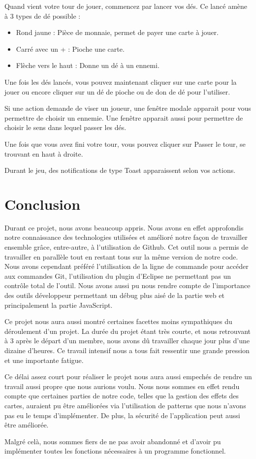 \documentclass[11pt]{scrreprt}
\begin{document}
    Quand vient votre tour de jouer, commencez par lancer vos dés. Ce lancé amène à 3 types de dé possible :

    \begin{itemize}
        \item Rond jaune : Pièce de monnaie, permet de payer une carte à jouer.
        \item Carré avec un + : Pioche une carte.
        \item Flèche vers le haut : Donne un dé à un ennemi.
    \end{itemize}

    Une fois les dés lancés, vous pouvez maintenant cliquer sur une carte pour la jouer ou encore cliquer sur un dé de pioche ou de don de dé pour l'utiliser.

    Si une action demande de viser un joueur, une fenêtre modale apparait pour vous permettre de choisir un ennemie. Une fenêtre apparait aussi pour permettre de choisir le sens dans lequel passer les dés.

    Une fois que vous avez fini votre tour, vous pouvez cliquer sur \og Passer le tour\fg{}, se trouvant en haut à droite.

    Durant le jeu, des notifications de type Toast apparaissent selon vos actions.

    \chapter{Conclusion}
    Durant ce projet, nous avons beaucoup appris. Nous avons en effet approfondis notre connaissance des technologies utilisées et amélioré notre façon de travailler ensemble grâce, entre-autre, à l'utilisation de Github. Cet outil nous a permis de travailler en parallèle tout en restant tous sur la même version de notre code. Nous avons cependant préféré l'utilisation de la ligne de commande pour accéder aux commandes Git, l'utilisation du plugin d'Eclipse ne permettant pas un contrôle total de l'outil. Nous avons aussi pu nous rendre compte de l'importance des \og outils développeur\fg{} permettant un débug plus aisé de la partie web et principalement la partie JavaScript.

    Ce projet nous aura aussi montré certaines facettes moins sympathiques du déroulement d'un projet. La durée du projet étant très courte, et nous retrouvant à 3 après le départ d'un membre, nous avons dû travailler chaque jour plus d'une dizaine d'heures. Ce travail intensif nous a tous fait ressentir une grande pression et une importante fatigue.

    Ce délai assez court pour réaliser le projet nous aura aussi empechés de rendre un travail aussi propre que nous aurions voulu. Nous nous sommes en effet rendu compte que certaines parties de notre code, telles que la gestion des effets des cartes, auraient pu être améliorées via l'utilisation de patterns que nous n'avons pas eu le temps d'implémenter. De plus, la sécurité de l'application peut aussi être améliorée.

    Malgré celà, nous sommes fiers de ne pas avoir abandonné et d'avoir pu implémenter toutes les fonctions nécessaires à un programme fonctionnel.
\end{document}
